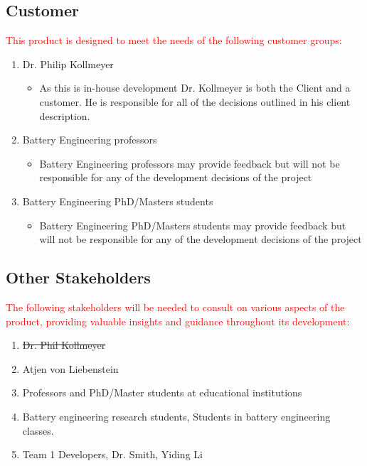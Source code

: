 \documentclass[12pt]{article}
\begin{document}
\subsection{Customer}
\textcolor{red}{This product is designed to meet the needs of the following customer groups:}
\begin{enumerate}
    \item Dr. Philip Kollmeyer
    \begin{itemize} 
        \item As this is in-house development Dr. Kollmeyer is both the Client and a customer. He is responsible for all of the decisions outlined in his client description.
    \end{itemize}
    \item Battery Engineering professors
    \begin{itemize}
        \item Battery Engineering professors may provide feedback but will not be responsible for any of the development decisions of the project
    \end{itemize}
    \item Battery Engineering PhD/Masters students
    \begin{itemize}
        \item Battery Engineering PhD/Masters students may provide feedback but will not be responsible for any of the development decisions of the project
    \end{itemize}
\end{enumerate}

\subsection{Other Stakeholders}
\textcolor{red}{The following stakeholders will be needed to consult on various aspects of the product, providing valuable insights and guidance throughout its development:}
\begin{enumerate}
    \item \sout{Dr. Phil Kollmeyer}
    \item Atjen von Liebenstein
    \item Professors and PhD/Master students at educational institutions
    \item Battery engineering research students, Students in battery engineering classes.
    \item Team 1 Developers, Dr. Smith, Yiding Li
\end{enumerate}
\end{document}
